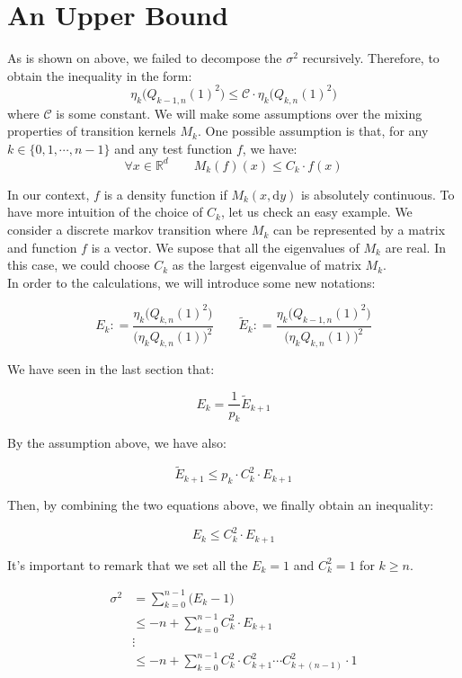 \documentclass[a4paper,10pt]{article}
\begin{document}
\section{An Upper Bound}

As is shown on above, we failed to decompose the $\sigma^2$ recursively.
Therefore, to obtain the inequality in the form:
$$\eta_k \big( Q_{k-1,n}(1)^2 \big) \leq \mathcal{C}\cdot \eta_k \big( Q_{k,n}(1)^2\big)$$
where $\mathcal{C}$ is some constant. We will make some assumptions over the mixing properties of transition kernels $M_k$.
One possible assumption is that, for any $k \in \{0,1,\cdots,n-1\}$ and any test function $f$, we have:
$$\forall x \in \mathds{R}^d \qquad M_k(f)(x) \leq C_k \cdot f(x)$$

In our context, $f$ is a density function if $M_k(x,\mathrm{d}y)$ is absolutely
continuous. To have more intuition of the choice of $C_k$, let us check an easy example.
We consider a discrete markov transition where $M_k$ can be represented by a
matrix and function $f$ is a vector. We supose that all the eigenvalues 
of $M_k$ are real. In this case, we could choose 
$C_k$ as the largest eigenvalue of matrix $M_k$.\\ 
In order to the calculations, we will introduce some new notations:

$$E_k : = \frac{\eta_{k} \big(Q_{k,n}(1)^2\big)}{\big(\eta_{k} Q_{k,n}(1)\big)^2}
\qquad
\tilde E_k : =  \frac{\eta_{k} \big(Q_{k-1,n}(1)^2\big)}{\big(\eta_{k} Q_{k,n}(1)\big)^2}$$ 

We have seen in the last section that:

$$E_k = \frac{1}{p_k}\tilde E_{k+1}$$

By the assumption above, we have also:

$$ \tilde E_{k+1} \leq p_k \cdot C_k^2 \cdot E_{k+1}$$

Then, by combining the two equations above, we finally obtain an inequality:

$$E_k \leq C^2_k \cdot E_{k+1}$$

It's important to remark that we set all the $E_k = 1$ and $C^2_k = 1$ for $k \geq n$.

\begin{equation*}
        \begin{split}
                \sigma^2 &= \sum_{k = 0}^{n-1} \big( E_k - 1\big) \\
                &\leq -n +\sum _{k=0}^{n-1} C^2_k \cdot E_{k+1}\\
                &\vdots \\
                &\leq -n + \sum_{k=0}^{n-1} C^2_k \cdot C^2_{k+1}\cdots C^2_{k+(n-1)}\cdot 1\\
        \end{split}
\end{equation*}
\end{document}
